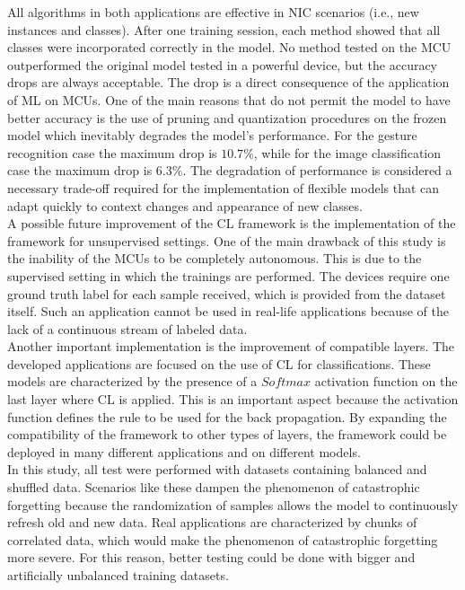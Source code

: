 \documentclass[12pt]{report}
\begin{document}
All algorithms in both applications are effective in NIC scenarios (i.e., new instances and classes). After one training session, each method showed that all classes were incorporated correctly in the model. No method tested on the MCU outperformed the original model tested in a powerful device, but the accuracy drops are always acceptable. The drop is a direct consequence of the application of ML on MCUs. One of the main reasons that do not permit the model to have better accuracy is the use of pruning and quantization procedures on the frozen model which inevitably degrades the model's performance. For the gesture recognition case the maximum drop is $10.7 \%$, while for the image classification case the maximum drop is $6.3 \%$. The degradation of performance is considered a necessary trade-off required for the implementation of flexible models that can adapt quickly to context changes and appearance of new classes.\\

A possible future improvement of the CL framework is the implementation of the framework for unsupervised settings. One of the main drawback of this study is the inability of the MCUs to be completely autonomous. This is due to the supervised setting in which the trainings are performed. The devices require one ground truth label for each sample received, which is provided from the dataset itself. Such an application cannot be used in real-life applications because of the lack of a continuous stream of labeled data.\\
Another important implementation is the improvement of compatible layers. The developed applications are focused on the use of CL for classifications. These models are characterized by the presence of a $Softmax$ activation function on the last layer where CL is applied. This is an important aspect because the activation function defines the rule to be used for the back propagation. By expanding the compatibility of the framework to other types of layers, the framework could be deployed in many different applications and on different models.\\
In this study, all test were performed with datasets containing balanced and shuffled data. Scenarios like these dampen the phenomenon of catastrophic forgetting because the randomization of samples allows the model to continuously refresh old and new data. Real applications are characterized by chunks of correlated data, which would make the phenomenon of catastrophic forgetting more severe. For this reason, better testing could be done with bigger and artificially unbalanced training datasets.

\printbibliography
\end{document}
